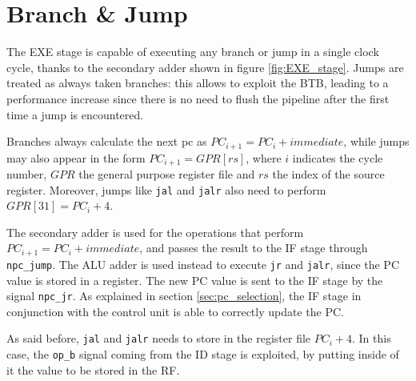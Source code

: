 \section{Branch \& Jump}

The EXE stage is capable of executing any branch or jump in a single clock cycle, thanks to the secondary adder shown in figure \ref{fig:EXE_stage}.
Jumps are treated as always taken branches: this allows to exploit the BTB, leading to a performance increase since there is no need to flush the pipeline
after the first time a jump is encountered.

Branches always calculate the next pc as $PC_{i+1} = PC_{i} + immediate$, while jumps may also appear in the form $PC_{i+1} = GPR[rs]$, where $i$ indicates
the cycle number, $GPR$ the general purpose register file and $rs$ the index of the source register. Moreover, jumps like \verb|jal| and \verb|jalr| also need
to perform $GPR[31] = PC_{i} + 4$.

The secondary adder is used for the operations that perform $PC_{i+1} = PC_{i} + immediate$, and passes the result to the IF stage through \verb|npc_jump|.
The ALU adder is used instead to execute \verb|jr| and \verb|jalr|, since the PC value is stored in a register. The new PC value is sent to the IF stage by the
signal \verb|npc_jr|. As explained in section \ref{sec:pc_selection}, the IF stage in conjunction with the control unit is able to correctly update the PC.

As said before, \verb|jal| and \verb|jalr| needs to store in the register file $PC_{i} + 4$. In this case, the \verb|op_b| signal coming from the ID stage is exploited,
by putting inside of it the value to be stored in the RF.